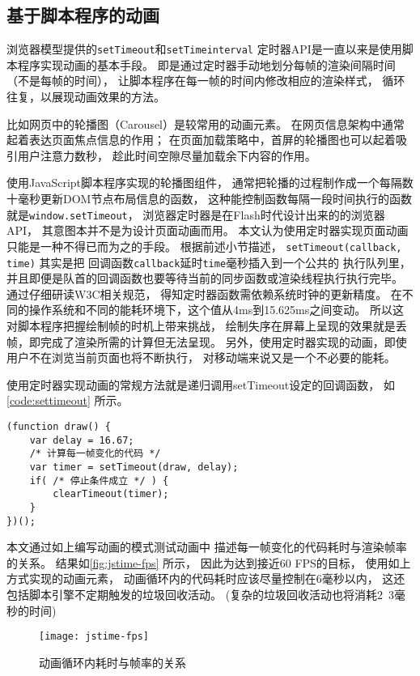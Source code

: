 \subsection{基于脚本程序的动画}

浏览器模型提供的\texttt{setTimeout}和\texttt{setTimeinterval}
定时器API是一直以来是使用脚本程序实现动画的基本手段。
即是通过定时器手动地划分每帧的渲染间隔时间（不是每帧的时间），
让脚本程序在每一帧的时间内修改相应的渲染样式，
循环往复，以展现动画效果的方法。

比如网页中的轮播图（Carousel）是较常用的动画元素。
在网页信息架构中通常起着表达页面焦点信息的作用；
在页面加载策略中，首屏的轮播图也可以起着吸引用户注意力数秒，
趁此时间空隙尽量加载余下内容的作用。

使用JavaScript脚本程序实现的轮播图组件，
通常把轮播的过程制作成一个每隔数十毫秒更新DOM节点布局信息的函数，
这种能控制函数每隔一段时间执行的函数就是\texttt{window.setTimeout}，
浏览器定时器是在Flash时代设计出来的的浏览器API，
其意图本并不是为设计页面动画而用。
本文认为使用定时器实现页面动画只能是一种不得已而为之的手段。
根据前述小节描述，
\texttt{setTimeout(callback, time)} 其实是把
回调函数\texttt{callback}延时\texttt{time}毫秒插入到一个公共的
执行队列里，
并且即便是队首的回调函数也要等待当前的同步函数或渲染线程执行执行完毕。
通过仔细研读W3C相关规范\cite{settimeout}，
得知定时器函数需依赖系统时钟的更新精度。
在不同的操作系统和不同的能耗环境下，这个值从4ms到15.625ms之间变动\cite{lowet2009co}。
所以这对脚本程序把握绘制帧的时机上带来挑战，
绘制失序在屏幕上呈现的效果就是丢帧，即完成了渲染所需的计算但无法呈现。
另外，使用定时器实现的动画，即使用户不在浏览当前页面也将不断执行，
对移动端来说又是一个不必要的能耗。

使用定时器实现动画的常规方法就是递归调用setTimeout设定的回调函数，
如\autoref{code:settimeout} 所示。
\begin{lstlisting}[caption=setTimeout的常规使用,label=code:settimeout]
(function draw() {
    var delay = 16.67;
    /* 计算每一帧变化的代码 */
    var timer = setTimeout(draw, delay);
    if( /* 停止条件成立 */ ) {
        clearTimeout(timer);
    }
})();
\end{lstlisting}

本文通过如上编写动画的模式测试动画中
描述每一帧变化的代码耗时与渲染帧率的关系。
结果如\autoref{fig:jstime-fps} 所示，
因此为达到接近60 FPS的目标，
使用如上方式实现的动画元素，
动画循环内的代码耗时应该尽量控制在6毫秒以内，
这还包括脚本引擎不定期触发的垃圾回收活动。
(复杂的垃圾回收活动也将消耗2~3毫秒的时间)
\begin{figure}[htbp]
	\centering
	\texttt{[image: jstime-fps]}
	\caption{动画循环内耗时与帧率的关系}\label{fig:jstime-fps}
\end{figure}

